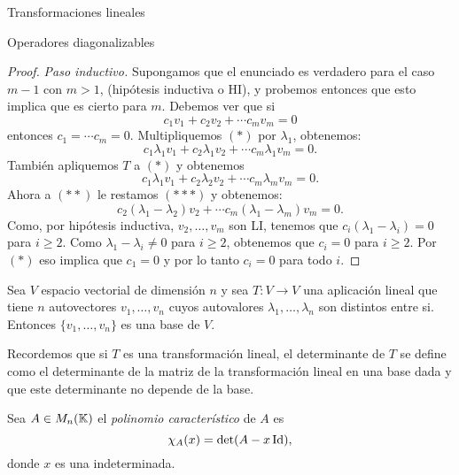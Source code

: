 \begin{chapter}{Transformaciones lineales}
\begin{section}{Operadores diagonalizables}
\begin{proof}
            \textit{Paso inductivo.} Supongamos que el enunciado es verdadero para el caso $m-1$ con $m>1$, (hipótesis inductiva o HI), y probemos entonces que esto implica que es cierto para $m$. Debemos ver  que si 
            \begin{equation}
            c_1v_1+	c_2v_2+ \cdots c_mv_m = 0 \tag{$*$}
            \end{equation}
            entonces $c_1 = \cdots c_m = 0$.
            Multipliquemos $(*)$ por $\lambda_1$, obtenemos:
            \begin{equation}
            c_1\lambda_1v_1+ c_2\lambda_1v_2+\cdots c_m\lambda_1v_m = 0. \tag{$**$}
            \end{equation}
            También apliquemos $T$ a $(*)$ y obtenemos
            \begin{equation}
            c_1\lambda_1v_1+ c_2\lambda_2v_2+\cdots c_m\lambda_mv_m = 0. \tag{$***$}
            \end{equation}
            Ahora a $(**)$ le restamos $(***)$ y obtenemos:
            \begin{equation}
            c_2(\lambda_1 -\lambda_2)v_2+\cdots c_m(\lambda_1 -\lambda_m)v_m = 0. 	 
            \end{equation}
            Como, por hipótesis inductiva, $v_2,\ldots,v_m$ son LI, tenemos que $c_i(\lambda_1 -\lambda_i)=0$ para $i\ge 2$. Como $\lambda_1 -\lambda_i \ne 0$ para $i\ge 2$, obtenemos que $c_i = 0$ para $i\ge 2$. Por $(*)$ eso implica que $c_1=0$ y por lo tanto $c_i=0$ para todo $i$.
        \end{proof}
        
        \begin{corolario}\label{cor-aut-li}
            Sea $V$ espacio vectorial de dimensión $n$ y sea $T: V \to V$ una aplicación lineal que tiene $n$
            autovectores $v_1,\ldots, v_n$ cuyos autovalores $\lambda_1,\ldots,\lambda_n$ son distintos entre
            si. Entonces $\{v_1,\ldots, v_n\}$ es una base de $V$.
        \end{corolario}
        
        Recordemos que si $T$  es una transformación lineal, el determinante de $T$  se define como el determinante de la matriz de la transformación lineal en una base dada y que este determinante no depende de la base.    
        
        \begin{definicion}
            Sea $A \in M_n(\mathbb K)$   el \textit{polinomio característico} de $A$ es $$\chi_A(x) = \det(A-x \operatorname{Id}),$$ donde $x$ es una indeterminada. 
            

\end{definicion}
\end{section}
\end{chapter}
